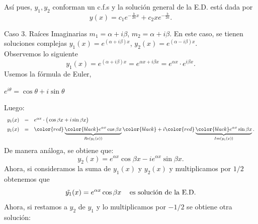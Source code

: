 \documentclass{beamer}
\begin{document}
\begin{frame}[t]
	\begin{block}{}
		Así pues, \(y_1,y_2\) conforman un c.f.s y la solución general de la E.D. está dada por
		\[
			y(x) = c_1e^{- \frac{b}{2a} x} +c_2xe^{- \frac{b}{2a}}.
		\]
	\end{block} \vspace{6mm}
	\begin{block}{Caso 3. Raíces Imaginarias \(m_1= \alpha +i \beta\), \(m_2= \alpha +i \beta\).}
		En este caso, se tienen soluciones complejas \(y_1(x) = e^{(\alpha +i \beta) x}\), \(y_2(x) = e^{(\alpha - i \beta) x}\). \\[2mm]
		Observemos lo siguiente
		\[
			y_1(x) = e^{(\alpha +i \beta) x} = e^{\alpha x+i \beta x} = e^{\alpha x} \cdot e^{i \beta x}.
		\]
		Usemos la fórmula de Euler,
		\begin{center}
			\color{red} \underline{\color{black} \(e^{i \theta} = \cos \theta + i \sin \theta\)} 
		\end{center} 
	\end{block}
\end{frame}

\begin{frame}[t]
	\begin{block}{}
		Luego:
		\[
			\begin{array}{rcl}
				y_1(x) & = & e^{\alpha x} \cdot \big(\cos \beta x+ i \sin \beta x\big) \\[2mm]
				y_1(x) & = & \color{red} \underbrace{\color{black} e^{\alpha x} \cos \beta x} _{Re(y_1(x))} \color{black} +i \color{red} \underbrace{\color{black} e^{\alpha x} \sin \beta x} _{Im(y_1(x))} .
			\end{array}
		\]
		De manera análoga, se obtiene que:
		\[
			y_2(x) = e^{\alpha x} \cos \beta x - i e^{\alpha x} \sin \beta x.
		\]
		Ahora, si consideramos la suma de \(y_1(x)\) y \(y_2(x)\) y multiplicamos por \(1/2\) obtenemos que
		\[
			\tilde{y_1} (x) = e^{\alpha x} \cos \beta x \hspace{3mm} \mbox{ es solución de la E.D.}
		\]
		Ahora, si restamos a \(y_2\) de \(y_1\) y lo multiplicamos por \(-1/2\) se obtiene otra solución:
	\end{block}
\end{frame}
\end{document}
